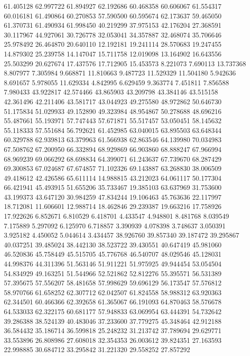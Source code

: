 61.405128
62.997722
61.894927
62.192686
60.468358
60.606067
61.554317
60.016181
61.490864
60.270853
57.590500
60.595674
62.173637
59.465050
61.370731
61.490934
61.998450
40.219299
37.975153
42.176204
27.368591
30.117967
44.927061
30.726778
32.053041
34.357887
32.468074
35.706646
25.978492
26.464870
20.640110
12.192181
19.241114
28.570683
19.247455
14.879302
25.239758
14.147047
15.711758
12.019098
13.164902
16.643556
25.503299
20.627674
17.437576
17.712905
15.453573
8.221073
7.690113
13.737368
8.807977
7.305984
9.668871
11.810663
9.487723
11.529329
11.504180
5.942636
8.691657
5.978055
11.629334
4.842995
6.629459
9.363774
7.451811
7.856588
7.980433
43.922817
42.574466
43.865903
43.209798
43.384146
43.515158
42.361496
42.211406
43.581717
43.044923
49.275580
48.972862
50.646730
51.175834
51.029933
49.152890
49.323984
48.954867
50.278688
48.696216
55.487661
55.193971
57.747443
57.671871
55.517457
53.050451
58.145632
55.118333
57.551684
56.792621
61.452985
63.040015
63.895503
63.648344
60.329788
62.939813
63.379963
61.566938
62.863546
64.139980
70.034983
67.508762
67.200950
66.332894
68.929869
66.903860
68.888247
67.966994
68.969239
69.066292
68.698834
64.399071
61.243637
67.739670
68.287429
69.300853
67.024687
67.674857
71.102326
69.143887
63.268830
38.006509
49.418612
42.426586
65.611114
14.988815
43.212023
64.061117
50.177304
66.421941
45.493915
51.655206
35.733467
19.385103
63.637969
31.753600
43.199373
43.647120
30.984259
47.834244
19.106463
45.763636
22.117997
18.712081
11.606601
12.988714
18.462846
29.239387
19.663216
17.758926
17.922626
6.852671
6.810529
6.418701
4.433547
4.948801
8.481768
8.039549
7.175889
5.297092
6.125970
6.718857
3.390939
4.078398
3.748637
3.050391
3.925182
4.450052
5.044614
3.434457
38.926760
39.857340
39.187472
39.295867
40.037251
39.485024
38.442130
38.523722
39.430551
40.647419
45.981060
46.520836
45.758449
45.515705
45.776768
46.540707
48.029546
45.128031
44.998376
44.311396
51.563146
51.911221
51.975925
49.944454
53.054504
54.834929
49.163251
51.544966
52.521862
52.812276
55.395571
56.531389
57.395675
57.556207
58.481658
57.998629
59.696129
56.173547
57.576812
58.970766
61.658252
62.307712
62.042507
61.824558
58.988312
63.920363
62.344501
60.466366
62.392658
61.365067
66.191093
64.870463
58.576678
64.533033
62.322175
60.681177
57.948833
63.069954
63.444391
54.732642
39.286388
38.524139
40.483046
37.233600
37.779275
45.348464
42.912188
36.584432
35.186714
36.599818
25.248232
31.213742
37.789694
29.629771
33.553896
26.808986
27.608018
32.354353
26.003612
39.824351
27.163593
22.998885
30.684712
33.295842
31.221320
29.558252
27.857292
